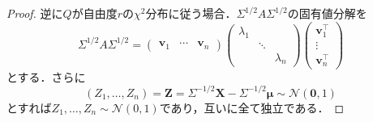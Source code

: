 \begin{proof}
  逆に\(Q\)が自由度\(r\)の\(\chi^2\)分布に従う場合．\(\Sigma^{1/2} A \Sigma^{1/2}\)の固有値分解を
  \[
  \Sigma^{1/2} A \Sigma^{1/2} =
  \begin{pmatrix}
    \boldsymbol{v}_1 & \cdots & \boldsymbol{v}_n
  \end{pmatrix}
  \begin{pmatrix}
    \lambda_1 & & \\
    & \ddots & \\
    & & \lambda_n
  \end{pmatrix}
  \begin{pmatrix}
    \boldsymbol{v}_1^\top \\ \vdots \\ \boldsymbol{v}_n^\top
  \end{pmatrix}
  \]
  とする．さらに
  \[ (Z_1, \ldots, Z_n) = \boldsymbol{Z} = \Sigma^{-1/2} \boldsymbol{X} - \Sigma^{-1/2}\boldsymbol\mu \sim \mathcal{N}(\boldsymbol{0}, 1) \]
  とすれば\(Z_1, \ldots, Z_n \sim \mathcal{N}(0, 1)\)であり，互いに全て独立である．


\end{proof}
